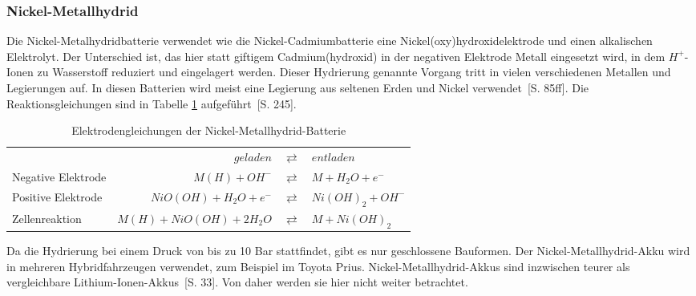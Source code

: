 \subsubsection{Nickel-Metallhydrid}
Die Nickel-Metalhydridbatterie verwendet wie die Nickel-Cadmiumbatterie eine Nickel(oxy)hydroxidelektrode und einen alkalischen Elektrolyt. Der Unterschied ist, das hier statt giftigem Cadmium(hydroxid) in der negativen Elektrode Metall eingesetzt wird, in dem $H^+$-Ionen zu Wasserstoff reduziert und eingelagert werden. Dieser Hydrierung genannte Vorgang tritt in vielen verschiedenen Metallen und Legierungen auf. In diesen Batterien wird meist eine Legierung aus seltenen Erden und Nickel verwendet~\cite{KiehneBattery}[S. 85ff]. Die Reaktionsgleichungen sind in Tabelle \ref{NiMH} aufgeführt~\cite{Sterner:2014}[S. 245].

\begin{table}\centering %
	\begin{tabularx}{\linewidth}{XrcX}
		\toprule
		&              $geladen$ & $\rightleftarrows$ & $entladen$        \\
		Negative Elektrode &          $M(H) + OH^-$ & $\rightleftarrows$ & $M + H_2O + e^-$  \\
		Positive Elektrode &   $NiO(OH) + H_2O + e^-$ & $\rightleftarrows$ & $Ni(OH)_2 + OH^-$ \\ \midrule
		Zellenreaktion     & $M(H) + NiO(OH) + 2H_2O$ & $\rightleftarrows$ & $M + Ni(OH)_2$    \\ \bottomrule
	\end{tabularx}
	\caption{Elektrodengleichungen der Nickel-Metallhydrid-Batterie}
	\label{NiMH}
\end{table}

Da die Hydrierung bei einem Druck von bis zu 10 Bar stattfindet, gibt es nur geschlossene Bauformen. Der Nickel-Metallhydrid-Akku wird in mehreren Hybridfahrzeugen verwendet, zum Beispiel im Toyota Prius. Nickel-Metallhydrid-Akkus sind inzwischen teurer als vergleichbare Lithium-Ionen-Akkus~\cite{Schimke:2012}[S. 33]. Von daher werden sie hier nicht weiter betrachtet.

